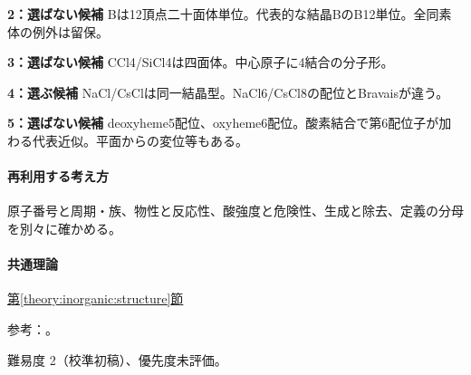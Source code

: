 \noindent\textbf{2：選ばない候補} Bは12頂点二十面体単位。代表的な結晶BのB12単位。全同素体の例外は留保。\par

\noindent\textbf{3：選ばない候補} CCl4/SiCl4は四面体。中心原子に4結合の分子形。\par

\noindent\textbf{4：選ぶ候補} NaCl/CsClは同一結晶型。NaCl6/CsCl8の配位とBravaisが違う。\par

\noindent\textbf{5：選ばない候補} deoxyheme5配位、oxyheme6配位。酸素結合で第6配位子が加わる代表近似。平面からの変位等もある。\par

\paragraph{再利用する考え方} 原子番号と周期・族、物性と反応性、酸強度と危険性、生成と除去、定義の分母を別々に確かめる。

\paragraph{共通理論} \hyperref[theory:inorganic:structure]{第\ref*{theory:inorganic:structure}節}

\par 参考：\cite{openstax_crystals,inorganic_metalloid_ref,inorganic_heme}。

\par 難易度 2（校準初稿）、優先度未評価。
